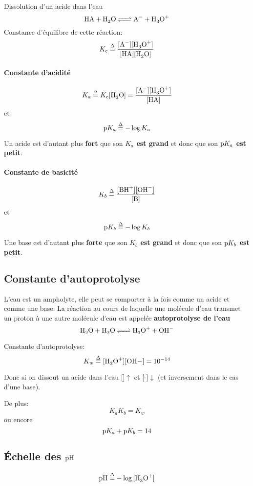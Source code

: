 Dissolution d'un acide dans l'eau
\[ \ce{HA + H2O <=> A- + H3O+} \]
Constance d'équilibre de cette réaction:
\[ \kc\eqdef\frac{[\ce{A-}][\ce{H3O+}]}{[\ce{HA}][\ce{H2O}]} \]

\paragraph{Constante d'acidité}
\[ K_a\eqdef\kc[\ce{H2O}]=\frac{[\ce{A-}][\ce{H3O+}]}{[\ce{HA}]} \]
et
\[ \mathrm{p}K_a\stackrel{\Delta}{=}-\log{K_a} \]

Un acide est d'autant plus \textbf{fort} que son \textbf{$K_a$ est grand} et donc que son \textbf{$\mathrm{p}K_a$ est petit}.\\

\paragraph{Constante de basicité}
\[ K_b\eqdef\frac{[\ce{BH+}][\ce{OH-}]}{[\ce{B}]} \]
et
\[ \mathrm{p}K_b\stackrel{\Delta}{=}-\log{K_b} \]

Une base est d'autant plus \textbf{forte} que son \textbf{$K_b$ est grand} et donc que son \textbf{$\mathrm{p}K_b$ est petit}.\\

\subsection{Constante d'autoprotolyse}
L'eau est un \textrm{ampholyte}, elle peut se comporter à la fois comme un acide et comme une base.
La réaction au cours de laquelle une molécule d'eau transmet un proton à une autre molécule d'eau est appelée \textbf{autoprotolyse de l'eau}
\[\ce{H2O + H2O <=> H3O+ + OH-}\]

Constante d'autoprotolyse:
\[ K_w\eqdef[\ce{H3O+}][\ce{OH}-]=10^{-14} \]

Donc si on dissout un acide dans l'eau []$\uparrow$ et [-]$\downarrow$ (et inversement dans le cas d'une base).

De plus:
\[ K_aK_b=K_w \]
ou encore
\[ \mathrm{p}K_a+\mathrm{p}K_b=14 \]

\subsection{\'Echelle des $\mathrm{pH}$}

$$\ph\eqdef-\log{[\ce{H3O+}]}$$

